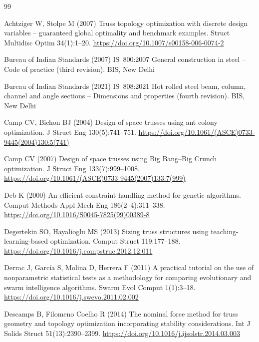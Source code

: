 \documentclass[lineno,pdflatex,sn-mathphys-num]{sn-jnl}
\begin{document}
\begin{thebibliography}{99}

Achtziger W, Stolpe M (2007) Truss topology optimization with discrete design variables -- guaranteed global optimality and benchmark examples. Struct Multidisc Optim 34(1):1--20. \url{https://doi.org/10.1007/s00158-006-0074-2}

Bureau of Indian Standards (2007) IS~800:2007 General construction in steel -- Code of practice (third revision). BIS, New Delhi

Bureau of Indian Standards (2021) IS~808:2021 Hot rolled steel beam, column, channel and angle sections -- Dimensions and properties (fourth revision). BIS, New Delhi

Camp CV, Bichon BJ (2004) Design of space trusses using ant colony optimization. J Struct Eng 130(5):741--751. \url{https://doi.org/10.1061/(ASCE)0733-9445(2004)130:5(741)}

Camp CV (2007) Design of space trusses using Big Bang--Big Crunch optimization. J Struct Eng 133(7):999--1008. \url{https://doi.org/10.1061/(ASCE)0733-9445(2007)133:7(999)}

Deb K (2000) An efficient constraint handling method for genetic algorithms. Comput Methods Appl Mech Eng 186(2--4):311--338. \url{https://doi.org/10.1016/S0045-7825(99)00389-8}

Degertekin SO, Hayalioglu MS (2013) Sizing truss structures using teaching-learning-based optimization. Comput Struct 119:177--188. \url{https://doi.org/10.1016/j.compstruc.2012.12.011}

Derrac J, Garc\'ia S, Molina D, Herrera F (2011) A practical tutorial on the use of nonparametric statistical tests as a methodology for comparing evolutionary and swarm intelligence algorithms. Swarm Evol Comput 1(1):3--18. \url{https://doi.org/10.1016/j.swevo.2011.02.002}

Descamps B, Filomeno Coelho R (2014) The nominal force method for truss geometry and topology optimization incorporating stability considerations. Int J Solids Struct 51(13):2390--2399. \url{https://doi.org/10.1016/j.ijsolstr.2014.03.003}


\end{thebibliography}
\end{document}
